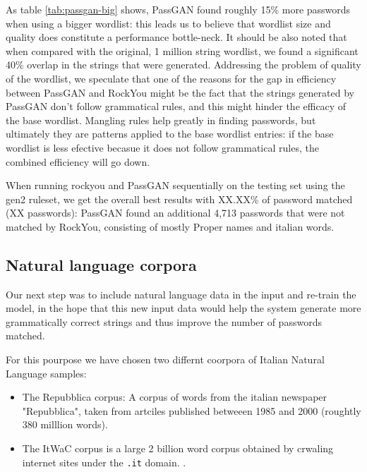 As table \ref{tab:passgan-big} shows, PassGAN found roughly 15\% more passwords when using a bigger wordlist: this leads us to believe that wordlist size and quality does constitute a performance bottle-neck. It should be also noted that when compared with the original, 1 million string wordlist, we found a significant 40\% overlap in the strings that were generated. Addressing the problem of quality of the wordlist, we speculate that one of the reasons for the gap in efficiency between PassGAN and RockYou might be the fact that the strings generated by PassGAN don't follow grammatical rules, and this might hinder the efficacy of the base wordlist. Mangling rules help greatly in finding passwords, but ultimately they are patterns applied to the base wordlist entries: if the base wordlist is less efective becasue it does not follow grammatical rules, the combined efficiency will go down.

When running rockyou and PassGAN sequentially on the testing set using the gen2 ruleset, we get the overall best results with XX.XX\% of password matched (XX passwords): PassGAN found an additional 4,713 passwords that were not matched by RockYou, consisting of mostly Proper names and italian words.

\subsection{Natural language corpora}
Our next step was to include natural language data in the input and re-train the model, in the hope that this new input data would help the system generate more grammatically correct strings and thus improve the number of passwords matched.

For this pourpose we have chosen two differnt coorpora of Italian Natural Language samples: 
\begin{itemize}
    \item The Repubblica corpus: A corpus of words from the italian newspaper "Repubblica", taken from artciles published betweeen 1985 and 2000 (roughtly 380 milllion words).\cite{repubblica_corpus}
    \item The ItWaC corpus is a large 2 billion word corpus obtained by crwaling internet sites under the \texttt{.it} domain. \cite{itwac_corpus}.  
\end{itemize}

